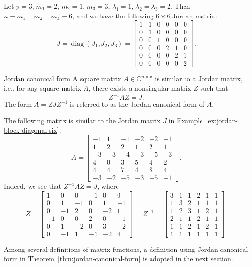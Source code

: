 \begin{Example}\label{ex:jordan-block-diagonal-six}
{Let $p=3$, $m_1=2$, $m_2=1$, $m_3=3$, $\lambda_1=1$, $\lambda_2=\lambda_3=2$. Then $n=m_1+m_2+m_3=6$, and we have the following $6\times6$ Jordan matrix:}
\[
J=\operatorname{diag}(J_1,J_2,J_3)=\left[\begin{array}{cc|c|ccc}1&1&0&0&0&0\\0&1&0&0&0&0\\\hline0&0&1&0&0&0\\\hline0&0&0&2&1&0\\0&0&0&0&2&1\\0&0&0&0&0&2\end{array}\right].
\]
\end{Example}

\begin{Theorem}{{Jordan canonical form}}\label{thm:jordan-canonical-form}
{A square matrix $A\in\mathbb{C}^{n\times n}$ is similar to a Jordan matrix, i.e., for any square matrix $A$, there exists a nonsingular matrix $Z$ such that}
\[Z^{-1}AZ=J.\]
{The form $A=ZJZ^{-1}$ is referred to as the Jordan canonical form of $A$.}
\end{Theorem}

\begin{Example}\label{ex:jordan-similarity-six}
{The following matrix is similar to the Jordan matrix $J$ in Example~\ref{ex:jordan-block-diagonal-six}.}
\[
A=\begin{bmatrix}-1&1&-1&-2&-2&-1\\1&2&2&1&2&1\\-3&-3&-4&-3&-5&-3\\4&0&3&5&4&2\\4&4&7&4&8&4\\-3&-2&-5&-3&-5&-1\end{bmatrix}.
\]
{Indeed, we see that $Z^{-1}AZ=J$, where}
\[
Z=\begin{bmatrix}1&0&0&-1&0&0\\0&1&-1&0&1&-1\\0&-1&2&0&-2&1\\-1&0&0&2&0&-1\\0&1&-2&0&3&-2\\0&-1&1&-1&-2&4\end{bmatrix},\quad
Z^{-1}=\begin{bmatrix}3&1&1&2&1&1\\1&3&2&1&1&1\\1&2&3&1&2&1\\2&1&1&2&1&1\\1&1&2&1&2&1\\1&1&1&1&1&1\end{bmatrix}.
\]
\end{Example}

{Among several definitions of matrix functions, a definition using Jordan canonical form in Theorem~\ref{thm:jordan-canonical-form} is adopted in the next section.}

